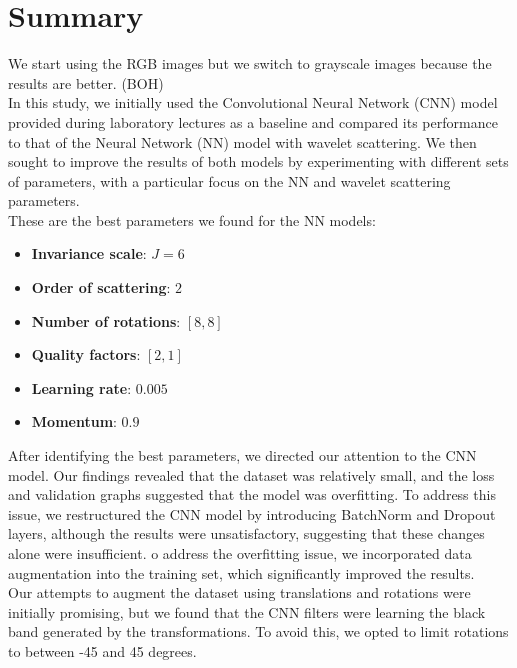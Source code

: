 \documentclass{report}
\begin{document}
\section{Summary}
We start using the RGB images but we switch to grayscale images because the results are better. (BOH)\\
In this study, we initially used the Convolutional Neural Network (CNN) model provided during laboratory
lectures as a baseline and compared its performance to that of the Neural Network (NN) model with wavelet scattering.
We then sought to improve the results of both models by experimenting with different sets of parameters, with a particular
focus on the NN and wavelet scattering parameters. \\
These are the best parameters we found for the NN models:
\begin{itemize}
  \item \textbf{Invariance scale}: $J=6$
  \item \textbf{Order of scattering}: $2$
  \item \textbf{Number of rotations}: $[8, 8]$
  \item \textbf{Quality factors}: $[2, 1]$
  \item \textbf{Learning rate}: $0.005$ 
  \item \textbf{Momentum}: $0.9$
\end{itemize}
After identifying the best parameters, we directed our attention to the CNN model.
Our findings revealed that the dataset was relatively small, and the loss and validation
graphs suggested that the model was overfitting. To address this issue, we restructured the
CNN model by introducing BatchNorm and Dropout layers, although
the results were unsatisfactory, suggesting that these changes alone were insufficient.
o address the overfitting issue, we incorporated data augmentation into the training set,
which significantly improved the results. \\
Our attempts to augment the dataset using translations and rotations were initially promising,
but we found that the CNN filters were learning the black band generated by the transformations.
To avoid this, we opted to limit rotations to between -45 and 45 degrees.\\
\end{document}
